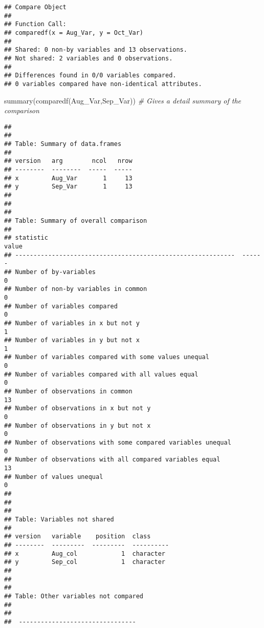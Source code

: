 \documentclass[
]{article}
\newenvironment{Shaded}{\begin{snugshade}}{\end{snugshade}}
\newcommand{\CommentTok}[1]{\textcolor[rgb]{0.56,0.35,0.01}{\textit{#1}}}
\newcommand{\FunctionTok}[1]{\textcolor[rgb]{0.00,0.00,0.00}{#1}}
\newcommand{\NormalTok}[1]{#1}
\begin{document}
\begin{verbatim}
## Compare Object
## 
## Function Call: 
## comparedf(x = Aug_Var, y = Oct_Var)
## 
## Shared: 0 non-by variables and 13 observations.
## Not shared: 2 variables and 0 observations.
## 
## Differences found in 0/0 variables compared.
## 0 variables compared have non-identical attributes.
\end{verbatim}

\begin{Shaded}
\begin{Highlighting}[]
 \FunctionTok{summary}\NormalTok{(}\FunctionTok{comparedf}\NormalTok{(Aug\_Var,Sep\_Var)) }\CommentTok{\# Gives a detail summary of the comparison}
\end{Highlighting}
\end{Shaded}

\begin{verbatim}
## 
## 
## Table: Summary of data.frames
## 
## version   arg        ncol   nrow
## --------  --------  -----  -----
## x         Aug_Var       1     13
## y         Sep_Var       1     13
## 
## 
## 
## Table: Summary of overall comparison
## 
## statistic                                                      value
## ------------------------------------------------------------  ------
## Number of by-variables                                             0
## Number of non-by variables in common                               0
## Number of variables compared                                       0
## Number of variables in x but not y                                 1
## Number of variables in y but not x                                 1
## Number of variables compared with some values unequal              0
## Number of variables compared with all values equal                 0
## Number of observations in common                                  13
## Number of observations in x but not y                              0
## Number of observations in y but not x                              0
## Number of observations with some compared variables unequal        0
## Number of observations with all compared variables equal          13
## Number of values unequal                                           0
## 
## 
## 
## Table: Variables not shared
## 
## version   variable    position  class     
## --------  ---------  ---------  ----------
## x         Aug_col            1  character 
## y         Sep_col            1  character 
## 
## 
## 
## Table: Other variables not compared
## 
##                                  
##  --------------------------------

\end{verbatim}
\end{document}
